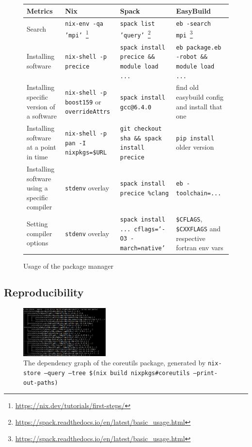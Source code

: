 \documentclass{eceasst}
\begin{document}
\begin{figure}
  \normalsize
  \caption{Usage of the package manager}
  \label{table:comparison-usage}
  \centering
  \begin{tabular}{|p{2cm}|p{3.5cm}|p{3.5cm}|p{3.5cm}|}
    \hline
    \textbf{Metrics} & \textbf{Nix} & \textbf{Spack} & \textbf{EasyBuild} \\ \hline
    Search & \texttt{nix-env -qa 'mpi'}~\footnote{\url{https://nix.dev/tutorials/first-steps/}} & \texttt{spack list 'query'}~\footnote{\url{https://spack.readthedocs.io/en/latest/basic_usage.html}} & \texttt{eb -search mpi}~\footnote{\url{https://spack.readthedocs.io/en/latest/basic_usage.html}} \\ \hline
    Installing software & \texttt{nix-shell -p precice} & \texttt{spack install precice \&\& module load ...} & \texttt{eb package.eb -robot \&\& module load ...} \\ \hline
    Installing specific version of a software & \texttt{nix-shell -p boost159} or \texttt{overrideAttrs} & \texttt{spack install gcc@6.4.0} & find old easybuild config and install that one \\ \hline
    Installing software at a point in time & \texttt{nix-shell -p pan -I nixpkgs=\$URL} & \texttt{git checkout sha \&\& spack install precice} & \texttt{pip install} older version  \\ \hline
    Installing software using a specific compiler & \texttt{stdenv} overlay & \texttt{spack install precice \%clang} & \texttt{eb -toolchain=...} \\ \hline
    Setting compiler options & \texttt{stdenv} overlay & \texttt{spack install ... cflags='-O3 -march=native'} & \texttt{\$CFLAGS}, \texttt{\$CXXFLAGS} and respective fortran env vars \\ \hline
  \end{tabular}
\end{figure}

\subsection{Reproducibility}

\begin{figure}
    \centering
    \includegraphics[width=0.4\textwidth]{figures/nix-tree.png}
    \caption{The dependency graph of the coreutils package, generated by \texttt{nix-store --query --tree \$(nix build nixpkgs\#coreutils --print-out-paths)}}
    \label{fig:nix-tree}
\end{figure}
\end{document}
